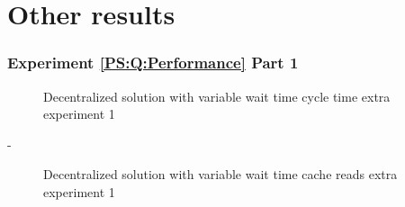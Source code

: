 
\chapter{Other results}\label{appendix:HardwareSpecification}
\subsection{Experiment \cref{PS:Q:Performance} Part 1}
\begin{figure}[h]
	\centering
	
	\caption{Decentralized solution with variable wait time cycle time extra experiment 1}
	\label{fig:exp:decen:sleep1}
\end{figure}

-
\begin{figure}[h]
	\centering
	
	\caption{Decentralized solution with variable wait time cache reads extra experiment 1}
	\label{fig:exp:decen:sleep1_cache}
\end{figure}

%	
